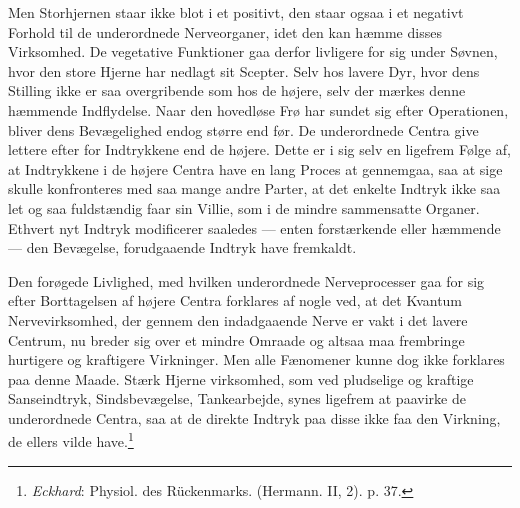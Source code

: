 \documentclass[12pt,a4paper,openany]{book}
\newcommand{\opage}[1]{\marginnote{\footnotesize\textit{[#1]}}}
\begin{document}
Men Storhjernen staar ikke blot i et positivt, den staar ogsaa i et
negativt Forhold til de underordnede Nerveorganer, idet den kan hæmme
disses Virksomhed. De vegetative Funktioner gaa derfor livligere for sig
under Søvnen, hvor den store Hjerne har nedlagt sit Scepter. Selv hos
lavere Dyr, hvor dens Stilling ikke er saa overgribende som hos de
højere, selv der mærkes denne hæmmende Indflydelse. Naar den hovedløse
Frø har sundet sig efter Operationen, bliver dens Bevægelighed endog
større end før. De underordnede Centra give lettere efter for
Indtrykkene end de højere. Dette er i sig selv en ligefrem Følge af, at
Indtrykkene i de højere Centra have en lang Proces at gennemgaa, saa at
sige skulle konfronteres med saa mange andre Parter, at det enkelte
Indtryk ikke saa let og saa fuldstændig faar sin Villie, som i de mindre
sammensatte Organer. Ethvert nyt Indtryk modificerer saaledes --- enten
forstærkende eller hæmmende --- den Bevægelse, forudgaaende Indtryk have
fremkaldt.

Den forøgede Livlighed, med hvilken underordnede Nerveprocesser gaa for
sig efter Borttagelsen af højere Centra forklares af nogle ved, at det
Kvantum Nervevirksomhed, der gennem den indadgaaende Nerve er vakt i det
lavere Centrum, nu breder sig over et mindre Omraade og altsaa maa
frembringe hurtigere og kraftigere Virkninger. Men alle Fænomener kunne
dog ikke forklares paa denne Maade. Stærk Hjerne%
\opage{53}virksomhed, som ved pludselige og kraftige Sanseindtryk,
Sindsbevægelse, Tankearbejde, synes ligefrem at paavirke de underordnede
Centra, saa at de direkte Indtryk paa disse ikke faa den Virkning, de
ellers vilde have.\footnote[1]{\emph{Eckhard}: Physiol. des Rückenmarks.
(Hermann. II, 2). p. 37.}
\end{document}
